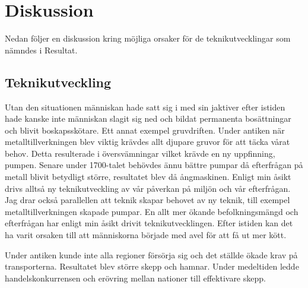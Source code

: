 \section{Diskussion}
Nedan följer en diskussion kring möjliga orsaker för de teknikutvecklingar som nämndes i Resultat. 

\subsection{Teknikutveckling}
Utan den situationen människan hade satt sig i med sin jaktiver efter istiden hade kanske inte människan slagit sig ned och bildat permanenta bosättningar och blivit boskapsskötare. Ett annat exempel gruvdriften. Under antiken när metalltillverkningen blev viktig krävdes allt djupare gruvor för att täcka vårat behov. Detta resulterade i översvämningar vilket krävde en ny uppfinning, pumpen. Senare under 1700-talet behövdes ännu bättre pumpar då efterfrågan på metall blivit betydligt större, resultatet blev då ångmaskinen. Enligt min åsikt drivs alltså ny teknikutveckling av vår påverkan på miljön och vår efterfrågan. Jag drar också parallellen att teknik skapar behovet av ny teknik, till exempel metalltillverkningen skapade pumpar. 
\newline
\newline
En allt mer ökande befolkningsmängd och efterfrågan har enligt min åsikt drivit teknikutvecklingen. Efter istiden kan det ha varit orsaken till att människorna började med avel för att få ut mer kött.   

Under antiken kunde inte alla regioner försörja sig och det ställde ökade krav på transporterna. Resultatet blev större skepp och hamnar. Under medeltiden ledde handelskonkurrensen och erövring mellan nationer till effektivare skepp. 


\newpage